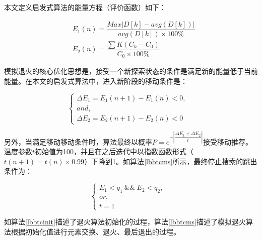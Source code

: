 本文定义启发式算法的能量方程（评价函数）如下：

%

\begin{align}\label{a4}
&E_1(n)=\dfrac{Max|D[k]-avg(D[k])|}{avg(D[k])\times 100\%}  \\
&E_2(n)=\dfrac{\sum{K}(C_k-C_0)}{C_0 \times 100\%}
\end{align}

模拟退火的核心优化思想是，接受一个新探索状态的条件是满足新的能量低于当前能量。在本文的启发式算法中，进入新阶段的移动条件是：

\begin{equation}
\left\{
\begin{array}{lr}
\Delta E_1= E_1(n+1)-E_1(n)<0, &  \\
and,& \\
\Delta E_2=E_2(n+1)-E_2(n)<0 &  
\end{array}
\right.
\end{equation}

另外，当满足移动移动条件时，算法最终以概率$P=e^{-|\dfrac{\Delta E_1 + \Delta E_2}{t} |}$接受移动推荐。温度参数$t$初始值为100，并且在之后迭代中以指数函数形式（$t(n+1)=t(n)\times 0.99$）下降到1。如算法\ref{lbbtcms}所示，最终停止搜索的跳出条件为：

\begin{equation}
\left\{
\begin{array}{lr}
E_1<q_1\  \&\& \ E_2<q_2, &  \\
or,& \\
t=1 &  
\end{array}
\right.
\end{equation}

如算法\ref{lbbtcinit}描述了退火算法初始化的过程，算法\ref{lbbtcms}描述了模拟退火算法根据初始化值进行元素交换、退火、最后退出的过程。

